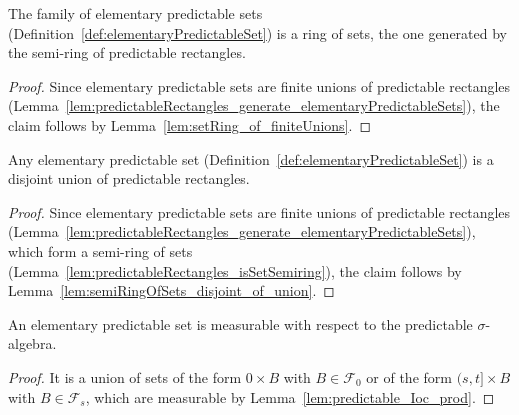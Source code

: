 \begin{lemma}\label{lem:elementaryPredictableSets_isSetRing_of}
  The family of elementary predictable sets (Definition~\ref{def:elementaryPredictableSet})
  is a ring of sets, the one generated by the semi-ring of predictable rectangles.
\end{lemma}

\begin{proof}
  Since elementary predictable sets are finite unions of predictable rectangles
  (Lemma~\ref{lem:predictableRectangles_generate_elementaryPredictableSets}),
  the claim follows by Lemma~\ref{lem:setRing_of_finiteUnions}.
\end{proof}

\begin{lemma}\label{lem:elementaryPredictableSets_asDisjointUnions}
  Any elementary predictable set (Definition~\ref{def:elementaryPredictableSet})
  is a disjoint union of predictable rectangles.
\end{lemma}

\begin{proof}
  Since elementary predictable sets are finite unions of predictable rectangles
  (Lemma~\ref{lem:predictableRectangles_generate_elementaryPredictableSets}),
  which form a semi-ring of sets (Lemma~\ref{lem:predictableRectangles_isSetSemiring}),
  the claim follows by Lemma~\ref{lem:semiRingOfSets_disjoint_of_union}.
\end{proof}

\begin{lemma}\label{lem:predictableSet_elementaryPredictableSet}
  \leanok
An elementary predictable set is measurable with respect to the predictable $\sigma$-algebra.
\end{lemma}

\begin{proof}
  \leanok
It is a union of sets of the form ${0} \times B$ with $B \in \mathcal{F}_0$ or of the form $(s, t] \times B$ with $B \in \mathcal{F}_s$, which are measurable by Lemma~\ref{lem:predictable_Ioc_prod}.
\end{proof}

